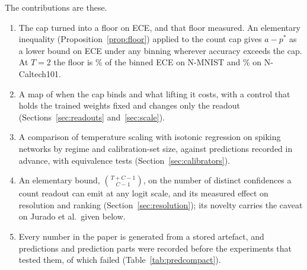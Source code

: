 \documentclass[10pt]{article}
\begin{document}
The contributions are these.
\begin{enumerate}
\item The cap turned into a floor on ECE, and that floor measured. An elementary inequality
  (Proposition~\ref{prop:floor}) applied to the count cap gives $a-p^{*}$ as a lower bound on ECE
  under any binning wherever accuracy exceeds the cap. At $T=2$ the floor is
  \frNmTwoInt\% of the binned ECE on N-MNIST and \frNcTwoInt\% on N-Caltech101. %
\item A map of when the cap binds and what lifting it costs, with a control that holds the
  trained weights fixed and changes only the readout (Sections~\ref{sec:readouts}
  and~\ref{sec:scale}).
\item A comparison of temperature scaling with isotonic regression on spiking networks by
  regime and calibration-set size, against predictions recorded in advance, with equivalence
  tests (Section~\ref{sec:calibrators}).
\item An elementary bound, $\binom{T+C-1}{C-1}$, on the number of distinct confidences a count readout can
  emit at any logit scale, and its measured effect on resolution and ranking
  (Section~\ref{sec:resolution}); its novelty carries the caveat on Jurado et al.\ given below.
\item Every number in the paper is generated from a stored artefact, and \predictionsEverything{} %
  predictions and prediction parts were recorded before the experiments that tested them, of which
  \predictionsEverythingFalsified{} failed (Table~\ref{tab:predcompact}). %
\end{enumerate}
\end{document}
